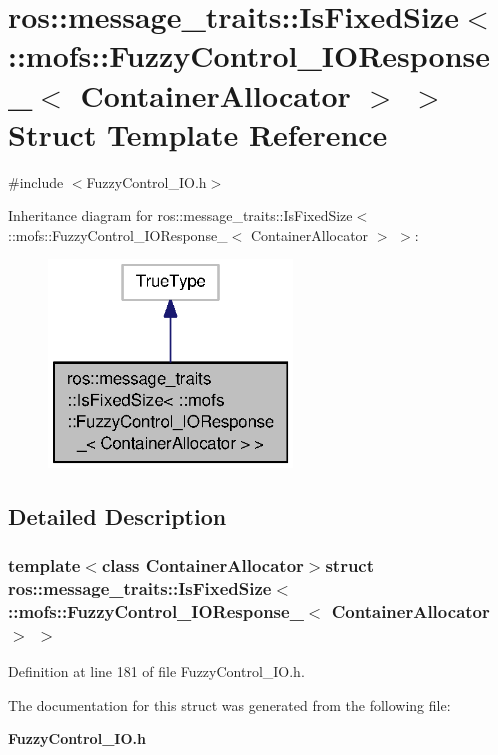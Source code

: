 \section{ros\-:\-:message\-\_\-traits\-:\-:Is\-Fixed\-Size$<$ \-:\-:mofs\-:\-:Fuzzy\-Control\-\_\-\-I\-O\-Response\-\_\-$<$ Container\-Allocator $>$ $>$ Struct Template Reference}
\label{structros_1_1message__traits_1_1IsFixedSize_3_01_1_1mofs_1_1FuzzyControl__IOResponse___3_01ContainerAllocator_01_4_01_4}


{\ttfamily \#include $<$Fuzzy\-Control\-\_\-\-I\-O.\-h$>$}



Inheritance diagram for ros\-:\-:message\-\_\-traits\-:\-:Is\-Fixed\-Size$<$ \-:\-:mofs\-:\-:Fuzzy\-Control\-\_\-\-I\-O\-Response\-\_\-$<$ Container\-Allocator $>$ $>$\-:\nopagebreak
\begin{figure}[H]
\begin{center}
\leavevmode
\includegraphics[width=184pt]{structros_1_1message__traits_1_1IsFixedSize_3_01_1_1mofs_1_1FuzzyControl__IOResponse___3_01Conta2977c3abc204ec51f4a3f03141ab7b07}
\end{center}
\end{figure}


\subsection{Detailed Description}
\subsubsection*{template$<$class Container\-Allocator$>$struct ros\-::message\-\_\-traits\-::\-Is\-Fixed\-Size$<$ \-::mofs\-::\-Fuzzy\-Control\-\_\-\-I\-O\-Response\-\_\-$<$ Container\-Allocator $>$ $>$}



Definition at line 181 of file Fuzzy\-Control\-\_\-\-I\-O.\-h.



The documentation for this struct was generated from the following file\-:\begin{DoxyCompactItemize}
\item 
{\bf Fuzzy\-Control\-\_\-\-I\-O.\-h}\end{DoxyCompactItemize}
